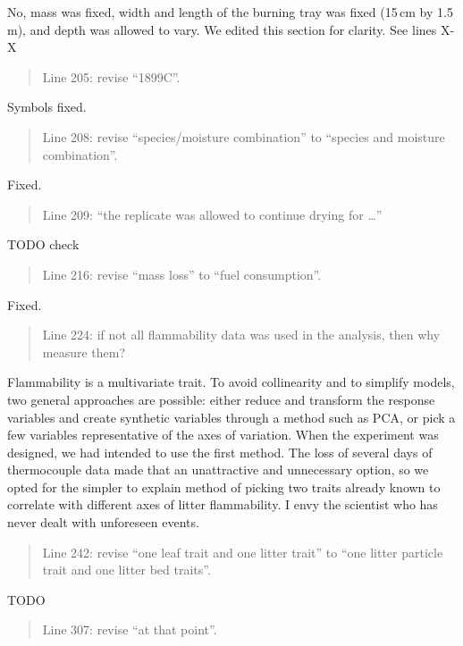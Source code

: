 \documentclass[letterpaper, 12pt]{letter}
\begin{document}
\begin{letter}{}
No, mass was fixed, width and length of the burning tray was fixed (15\,cm by
1.5\,m), and depth was allowed to vary. We edited this section for clarity. See
lines X-X

\begin{quote}
Line 205: revise “1899C”.
\end{quote}


Symbols fixed.

\begin{quote}
  Line 208: revise “species/moisture combination” to “species and moisture
  combination”.
\end{quote}

Fixed.

\begin{quote}
  Line 209: “the replicate was allowed to continue drying for …”
\end{quote}

TODO check

\begin{quote}
  Line 216: revise “mass loss” to “fuel consumption”.
\end{quote}

Fixed.

\begin{quote}
  Line 224: if not all flammability data was used in the analysis, then why
  measure them?
\end{quote}

Flammability is a multivariate trait. To avoid collinearity and to simplify
models, two general approaches are possible: either reduce and transform the
response variables and create synthetic variables through a method such as PCA,
or pick a few variables representative of the axes of variation. When the
experiment was designed, we had intended to use the first method. The loss of
several days of thermocouple data made that an unattractive and unnecessary
option, so we opted for the simpler to explain method of picking two traits
already known to correlate with different axes of litter flammability. I envy
the scientist who has never dealt with unforeseen events.

\begin{quote}
  Line 242: revise “one leaf trait and one litter trait” to “one litter
  particle trait and one litter bed traits”.
\end{quote}

TODO

\begin{quote}
  Line 307: revise “at that point”.
\end{quote}


\end{letter}
\end{document}
